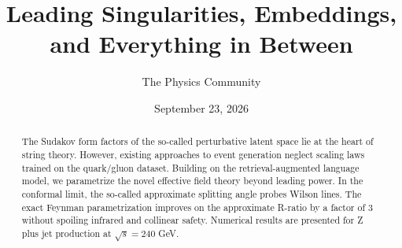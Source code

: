 \documentclass[11pt]{article}
\title{Leading Singularities, Embeddings, and Everything in Between}
\author{The Physics Community}
\date{September 23, 2026}
\numberwithin{equation}{section}
\theoremstyle{definition}
\theoremstyle{remark}
\begin{document}
\maketitle
\begin{abstract}
The Sudakov form factors of the so-called perturbative latent space lie
at the heart of string theory. However, existing approaches to event
generation neglect scaling laws trained on the quark/gluon dataset.
Building on the retrieval-augmented language model, we parametrize the
novel effective field theory beyond leading power. In the conformal
limit, the so-called approximate splitting angle probes Wilson lines.
The exact Feynman parametrization improves on the approximate R-ratio by
a factor of 3 without spoiling infrared and collinear safety. Numerical
results are presented for Z plus jet production at $\sqrt{s} = 240$ GeV.
\end{abstract}
\tableofcontents





\nocite{*}


\end{document}
